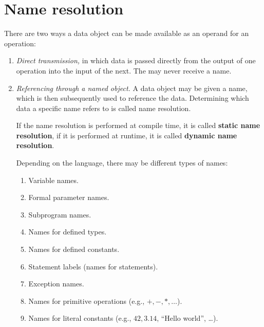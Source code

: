 \section{Name resolution}
There are two ways a data object can be made available as an operand for an operation:
\begin{enumerate}
\item \textit{Direct transmission,} in which data is passed directly from the output of one operation into the input of the next. The may never receive a name.
\item \textit{Referencing through a named object.} A data object may be given a name, which is then subsequently used to reference the data. Determining which data a specific name refers to is called name resolution.

If the name resolution is performed at compile time, it is called \textbf{static name resolution}, if it is performed at runtime, it is called \textbf{dynamic name resolution}.

Depending on the language, there may be different types of names:
\begin{enumerate}
\item Variable names.
\item Formal parameter names.
\item Subprogram names.
\item Names for defined types.
\item Names for defined constants.
\item Statement labels (names for statements).
\item Exception names.
\item Names for primitive operations (e.g., $+, -, *, \ldots$).
\item Names for literal constants (e.g., $42, 3.14$, ``Hello world'', \ldots).
\end{enumerate}
\end{enumerate}

